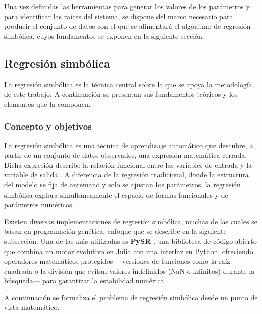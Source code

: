 \documentclass{article}
\begin{document}
Una vez definidas las herramientas para generar los valores de los parámetros y para identificar las raíces del sistema, se dispone del marco necesario para producir el conjunto de datos con el que se alimentará el algoritmo de regresión simbólica, cuyos fundamentos se exponen en la siguiente sección.

\subsection{Regresión simbólica} \label{sec:regresion}

La regresión simbólica es la técnica central sobre la que se apoya la metodología de este trabajo. A continuación se presentan sus fundamentos teóricos y los elementos que la componen.

\subsubsection{Concepto y objetivos}

La regresión simbólica es una técnica de aprendizaje automático que descubre, a partir de un conjunto de datos observados, una expresión matemática cerrada. Dicha expresión describe la relación funcional entre las variables de entrada y la variable de salida \cite{koza1992genetic}. A diferencia de la regresión tradicional, donde la estructura del modelo se fija de antemano y solo se ajustan los parámetros, la regresión simbólica explora simultáneamente el espacio de formas funcionales y de parámetros numéricos \cite{schmidt2009distilling}.

Existen diversas implementaciones de regresión simbólica, muchas de las cuales se basan en programación genética, enfoque que se describe en la siguiente subsección. Una de las más utilizadas es \textbf{PySR} \cite{cranmer2023pysr}, una biblioteca de código abierto que combina un motor evolutivo en Julia con una interfaz en Python, ofreciendo operadores matemáticos protegidos ---versiones de funciones como la raíz cuadrada o la división que evitan valores indefinidos (NaN o infinitos) durante la búsqueda--- para garantizar la estabilidad numérica.

A continuación se formaliza el problema de regresión simbólica desde un punto de vista matemático.
\end{document}
